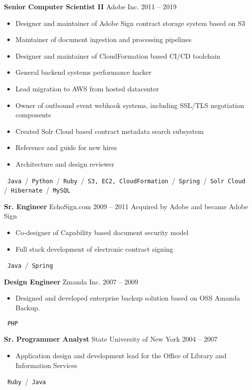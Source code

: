 \documentclass{res}
\begin{document}
        {\bf Senior Computer Scientist II} \hfill Adobe Inc. \hfill 2011 -- 2019
        \begin{itemize}
        \item Designer and maintainer of Adobe Sign contract storage system based on S3
        \item Maintainer of document ingestion and processing pipelines
        \item Designer and maintainer of CloudFormation based CI/CD toolchain
        \item General backend systems performance hacker
        \item Lead migration to AWS from hosted datacenter
        \item Owner of outbound event webhook systems, including SSL/TLS negotiation components
        \item Created Solr Cloud based contract metadata search subsystem
        \item Reference and guide for new hires
        \item Architecture and design reviewer
        \end{itemize}
	\texttt{ Java }\slash\texttt{ Python }\slash\texttt{ Ruby }\slash\texttt{ S3, EC2, CloudFormation }\slash\texttt{ Spring }\slash\texttt{ Solr Cloud }\slash\texttt{ Hibernate }\slash\texttt{ MySQL }
        

        {\bf Sr. Engineer} \hfill EchoSign.com 2009 -- 2011
        Acquired by Adobe and became Adobe Sign
        \begin{itemize}
        \item Co-designer of Capability based document security model
        \item Full stack development of electronic contract signing
        \end{itemize}
	\texttt{ Java }\slash\texttt{ Spring }
        
        {\bf Design Engineer} \hfill Zmanda Inc. \hfill 2007 -- 2009
        \begin{itemize}
        \item Designed and developed enterprise backup solution based on OSS Amanda Backup.
        \end{itemize}
        \texttt{ PHP }
        
        {\bf Sr. Programmer Analyst} \hfill State University of New York \hfill 2004 -- 2007
        \begin{itemize}
        \item Application design and development lead for the Office of Library and Information Services
        \end{itemize}
        \texttt{ Ruby }\slash\texttt{ Java }
          
\end{document}
